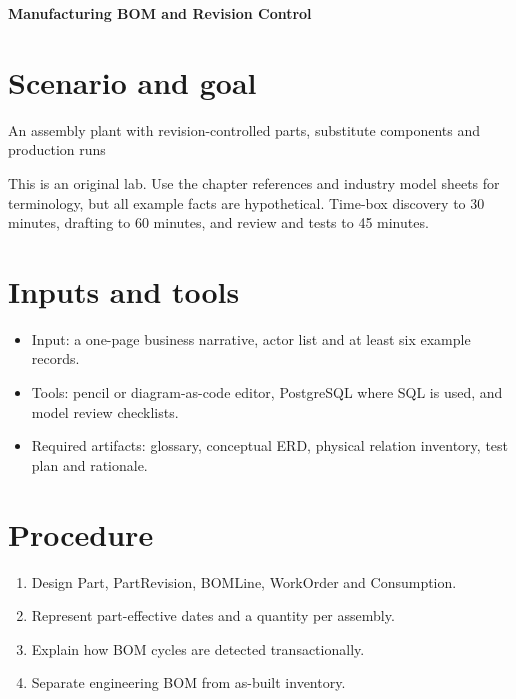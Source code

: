 \documentclass[11pt,letterpaper]{article}
\begin{document}
\begin{center}
{\LARGE\bfseries\color{navy} Manufacturing BOM and Revision Control}\par
\vspace{0.25em}{\large Practical modeling laboratory}\par
{}
\end{center}
\vspace{0.8em}
\section{Scenario and goal}
An assembly plant with revision-controlled parts, substitute components and production runs

This is an original lab. Use the chapter references and industry model sheets for terminology, but all example facts are hypothetical. Time-box discovery to 30 minutes, drafting to 60 minutes, and review and tests to 45 minutes.


\section{Inputs and tools}
\begin{itemize}
\item Input: a one-page business narrative, actor list and at least six example records.
\item Tools: pencil or diagram-as-code editor, PostgreSQL where SQL is used, and model review checklists.
\item Required artifacts: glossary, conceptual ERD, physical relation inventory, test plan and rationale.
\end{itemize}

\section{Procedure}
\begin{enumerate}
\item Design Part, PartRevision, BOMLine, WorkOrder and Consumption.
\item Represent part-effective dates and a quantity per assembly.
\item Explain how BOM cycles are detected transactionally.
\item Separate engineering BOM from as-built inventory.
\end{enumerate}
\end{document}
